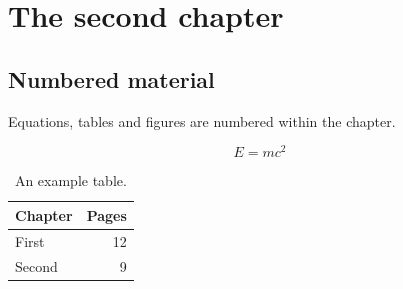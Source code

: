 \chapter{The second chapter}
\label{ch:second}

\section{Numbered material}

Equations, tables and figures are numbered within the chapter.

\begin{equation}
  E = mc^2
  \label{eq:energy}
\end{equation}

\begin{table}[h]
  \centering
  \begin{tabular}{lr}
    \toprule
    Chapter & Pages \\
    \midrule
    First & 12 \\
    Second & 9 \\
    \bottomrule
  \end{tabular}
  \caption{An example table.}
\end{table}
